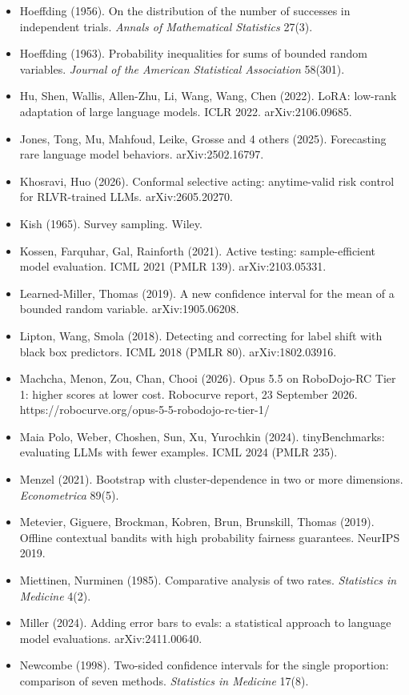 \documentclass[11pt]{article}
\begin{document}
\begin{itemize}
\item Hoeffding (1956). On the distribution of the number of successes in independent trials. \emph{Annals of Mathematical Statistics} 27(3).
\item Hoeffding (1963). Probability inequalities for sums of bounded random variables. \emph{Journal of the American Statistical Association} 58(301).
\item Hu, Shen, Wallis, Allen-Zhu, Li, Wang, Wang, Chen (2022). LoRA: low-rank adaptation of large language models. ICLR 2022. arXiv:2106.09685.
\item Jones, Tong, Mu, Mahfoud, Leike, Grosse and 4 others (2025). Forecasting rare language model behaviors. arXiv:2502.16797.
\item Khosravi, Huo (2026). Conformal selective acting: anytime-valid risk control for RLVR-trained LLMs. arXiv:2605.20270.
\item Kish (1965). Survey sampling. Wiley.
\item Kossen, Farquhar, Gal, Rainforth (2021). Active testing: sample-efficient model evaluation. ICML 2021 (PMLR 139). arXiv:2103.05331.
\item Learned-Miller, Thomas (2019). A new confidence interval for the mean of a bounded random variable. arXiv:1905.06208.
\item Lipton, Wang, Smola (2018). Detecting and correcting for label shift with black box predictors. ICML 2018 (PMLR 80). arXiv:1802.03916.
\item Machcha, Menon, Zou, Chan, Chooi (2026). Opus 5.5 on RoboDojo-RC Tier 1: higher scores at lower cost. Robocurve report, 23 September 2026. https://robocurve.org/opus-5-5-robodojo-rc-tier-1/
\item Maia Polo, Weber, Choshen, Sun, Xu, Yurochkin (2024). tinyBenchmarks: evaluating LLMs with fewer examples. ICML 2024 (PMLR 235).
\item Menzel (2021). Bootstrap with cluster-dependence in two or more dimensions. \emph{Econometrica} 89(5).
\item Metevier, Giguere, Brockman, Kobren, Brun, Brunskill, Thomas (2019). Offline contextual bandits with high probability fairness guarantees. NeurIPS 2019.
\item Miettinen, Nurminen (1985). Comparative analysis of two rates. \emph{Statistics in Medicine} 4(2).
\item Miller (2024). Adding error bars to evals: a statistical approach to language model evaluations. arXiv:2411.00640.
\item Newcombe (1998). Two-sided confidence intervals for the single proportion: comparison of seven methods. \emph{Statistics in Medicine} 17(8).

\end{itemize}
\end{document}

